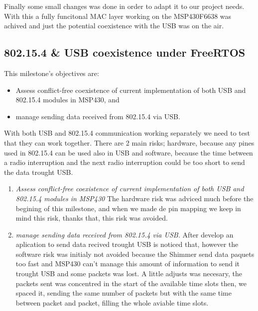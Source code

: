 \begin{enumerate}
		Finally some small changes was done in order to adapt it to our project needs. With this a fully funcitonal MAC layer working on the MSP430F6638 was achived and just the potential coexistence with the USB was on the air.\\

		\end{enumerate}


		\subsection{802.15.4 \& USB coexistence under FreeRTOS}
		\label{ssec:802.15.4.USB.FreeRTOS}	
		This milestone's objectives are:
		\begin{itemize}
		\item Assess conflict-free coexistence of current implementation of both USB and 802.15.4 modules in MSP430, and
		\item manage sending data received from 802.15.4 via USB.
		\end{itemize}
		With both USB and 802.15.4 communication working separately we need to test that they can work together. There are 2 main risks; hardware, because any pines used in 802.15.4 can be used also in USB and software, because the time between a radio interruption and the next radio interruption could be too short to send the data trought USB.\\

		\begin{enumerate}
		\item\emph{Assess conflict-free coexistence of current implementation of both USB and 802.15.4 modules in MSP430}
		The hardware risk was adviced much before the begining of this milestone, and when we made de pin mapping we keep in mind this risk, thanks that, this risk was avoided.\\

		\item\emph{manage sending data received from 802.15.4 via USB.}
		After develop an aplication to send data recived trought USB is noticed that, however the software risk was initialy not avoided because the Shimmer send data paquets too fast and MSP430 can't manage this amount of information to send it trought USB and some packets was lost. A little adjusts was necesary, the packets sent was concentred in the start of the available time slots then, we spaced it, sending the same number of packets but with the same time between packet and packet, filling the whole aviable time slots. \\
		\end{enumerate}
	
